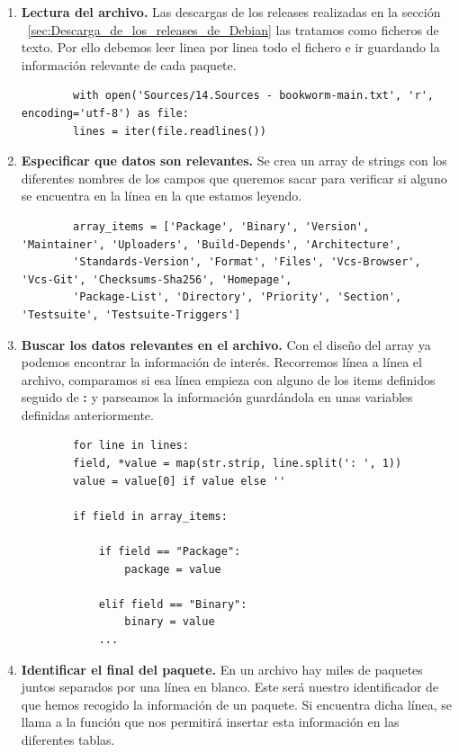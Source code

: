 \documentclass[a4paper, 12pt]{book}
\begin{document}
\begin{enumerate}
	\item \textbf{Lectura del archivo.} Las descargas de los releases realizadas en la sección  ~\ref{sec:Descarga_de_los_releases_de_Debian} las tratamos como ficheros de texto. Por ello debemos leer linea por linea todo el fichero e ir guardando la información relevante de cada paquete.
	
	\begin{verbatim}
		with open('Sources/14.Sources - bookworm-main.txt', 'r', encoding='utf-8') as file:
		lines = iter(file.readlines())
	\end{verbatim}
	
	\item \textbf{Especificar que datos son relevantes.} Se crea un array de strings con los diferentes nombres de los campos que queremos sacar para verificar si alguno se encuentra en la línea en la que estamos leyendo.
	
	\begin{verbatim}
		array_items = ['Package', 'Binary', 'Version', 'Maintainer', 'Uploaders', 'Build-Depends', 'Architecture',
		'Standards-Version', 'Format', 'Files', 'Vcs-Browser', 'Vcs-Git', 'Checksums-Sha256', 'Homepage',
		'Package-List', 'Directory', 'Priority', 'Section', 'Testsuite', 'Testsuite-Triggers']
	\end{verbatim}
	
	\item \textbf{Buscar los datos relevantes en el archivo.} Con el diseño del array ya podemos encontrar la información de interés. Recorremos línea a línea el archivo, comparamos si esa línea empieza con alguno de los items definidos seguido de \textbf{:} y parseamos la información guardándola en unas variables definidas anteriormente.
	
	\begin{verbatim}
		for line in lines:
		field, *value = map(str.strip, line.split(': ', 1))
		value = value[0] if value else ''
		
		if field in array_items:
	
			if field == "Package":
				package = value
			
			elif field == "Binary":
				binary = value
			...
	\end{verbatim}
	
		\item \textbf{Identificar el final del paquete.} En un archivo hay miles de paquetes juntos separados por una línea en blanco. Este será nuestro identificador de que hemos recogido la información de un paquete. Si encuentra dicha línea, se llama a la función que nos permitirá insertar esta información en las diferentes tablas.
		

\end{enumerate}
\end{document}
